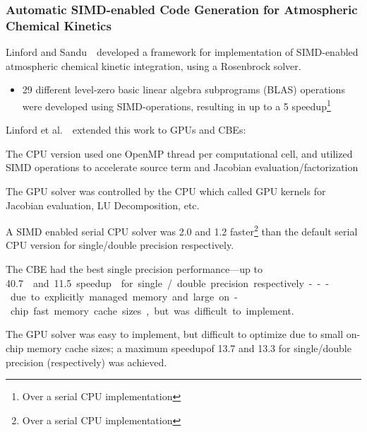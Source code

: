 \documentclass{beamer}
\begin{document}
\begin{frame}
 \frametitle{Automatic SIMD-enabled Code Generation for Atmospheric Chemical Kinetics}
 {
  Linford and Sandu~~developed a framework for implementation of SIMD-enabled atmospheric chemical kinetic integration, using a Rosenbrock solver.
 \begin{itemize}
  \item 29 different level-zero basic linear algebra subprograms (BLAS) operations were developed using SIMD-operations, resulting in up to a \SI{5}{\times} speedup\footnote{Over a serial CPU implementation}
 \end{itemize}
 }
 Linford et al.~~extended this work to GPUs and CBEs:
 \begin{itemize}
  {
  \item The CPU version used one OpenMP thread per computational cell, and utilized SIMD operations to accelerate source term and Jacobian evaluation\slash factorization
  \item The GPU solver was controlled by the CPU which called GPU kernels for Jacobian evaluation, LU Decomposition, etc.
  }
  {
  \item<2-> A SIMD enabled serial CPU solver was \SI{2.0}{\times} and \SI{1.2}{\times} faster\footnote{Over a serial CPU implementation} than the default serial CPU version for single\slash double precision respectively.
  \item<2-> The CBE had the best single precision performance---up to \SI{40.7}\times and \SI{11.5}{\times} speedup\footnotemark[\value{footnote}] for single\slash double precision respectively---due to explicitly managed memory and large on-chip fast memory cache sizes, but was difficult to implement.
  \item<2-> The GPU solver was easy to implement, but difficult to optimize due to small on-chip memory cache sizes; a maximum speedup\footnotemark[\value{footnote}] of \SI{13.7}{\times} and \SI{13.3}{\times} for single\slash double precision (respectively) was achieved.
  }
 \end{itemize}
\end{frame}
\end{document}
